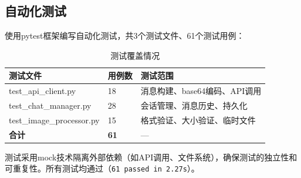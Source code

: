 \subsection{自动化测试}

使用pytest框架编写自动化测试，共3个测试文件、61个测试用例：

\begin{table}[htbp]
  \centering
  \caption{测试覆盖情况}
  \label{tab:test_coverage}
  \begin{tabular}{|l|l|l|}
    \hline
    \textbf{测试文件} & \textbf{用例数} & \textbf{测试范围} \\
    \hline
    test\_api\_client.py & 18 & 消息构建、base64编码、API调用 \\
    \hline
    test\_chat\_manager.py & 28 & 会话管理、消息历史、持久化 \\
    \hline
    test\_image\_processor.py & 15 & 格式验证、大小验证、临时文件 \\
    \hline
    \textbf{合计} & \textbf{61} & --- \\
    \hline
  \end{tabular}
\end{table}

测试采用mock技术隔离外部依赖（如API调用、文件系统），确保测试的独立性和可重复性。所有测试均通过（\texttt{61 passed in 2.27s}）。